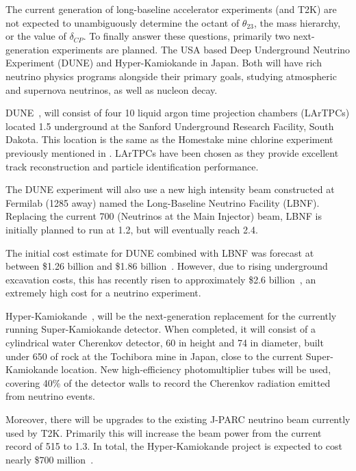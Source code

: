 The current generation of long-baseline accelerator experiments (\nova and T2K) are not expected
to unambiguously determine the octant of $\theta_{23}$, the mass hierarchy, or the value of
$\delta_{CP}$. To finally answer these questions, primarily two next-generation experiments are
planned. The USA based Deep Underground Neutrino Experiment (DUNE) and Hyper-Kamiokande in Japan.
Both will have rich neutrino physics programs alongside their primary goals, studying atmospheric
and supernova neutrinos, as well as nucleon decay.

DUNE~\cite{acciarri2016, abi2020}, will consist of four \SI{10}{} liquid argon time
projection chambers (LArTPCs) located \SI{1.5}{} underground at the Sanford Underground
Research Facility, South Dakota. This location is the same as the Homestake mine chlorine
experiment previously mentioned in . LArTPCs have been chosen
as they provide excellent track reconstruction and particle identification performance.

The DUNE experiment will also use a new high intensity beam constructed at Fermilab
(\SI{1285}{} away) named the Long-Baseline Neutrino Facility (LBNF). Replacing the
current \SI{700}{} \numi (Neutrinos at the Main Injector) beam, LBNF is initially planned
to run at \SI{1.2}{}, but will eventually reach \SI{2.4}{}.

The initial cost estimate for DUNE combined with LBNF was forecast at between \$1.26 billion and
\$1.86 billion~\cite{dune_cost}. However, due to rising underground excavation costs, this has
recently risen to approximately \$2.6 billion~\cite{aip_budget}, an extremely high cost for a
neutrino experiment.

Hyper-Kamiokande~\cite{hyper_dr, hyperkamiok2014}, will be the next-generation replacement for the
currently running Super-Kamiokande detector. When completed, it will consist of a cylindrical
water Cherenkov detector, \SI{60}{} in height and \SI{74}{} in diameter, built
under \SI{650}{} of rock at the Tochibora mine in Japan, close to the current
Super-Kamiokande location. New high-efficiency photomultiplier tubes will be used, covering 40\%
of the detector walls to record the Cherenkov radiation emitted from neutrino events.

Moreover, there will be upgrades to the existing J-PARC neutrino beam currently used by T2K.
Primarily this will increase the beam power from the current record of \SI{515}{} to
\SI{1.3}{}. In total, the Hyper-Kamiokande project is expected to cost nearly \$700
million~\cite{nature_budget}.